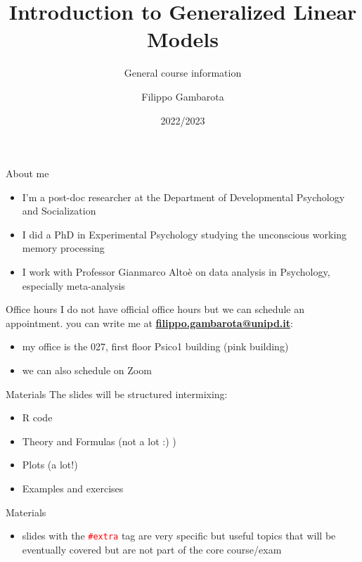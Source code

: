 \documentclass[
  ignorenonframetext,
]{beamer}
\title{Introduction to Generalized Linear Models}
\subtitle{General course information}
\author{Filippo Gambarota}
\date{2022/2023}
\institute{University of Padova}
\providecommand{\tightlist}{%
  \setlength{\itemsep}{0pt}\setlength{\parskip}{0pt}}
\begin{document}
\frame{\titlepage}

\begin{frame}{About me}
\protect\hypertarget{about-me}{}
\begin{itemize}
\tightlist
\item
  I'm a post-doc researcher at the Department of Developmental
  Psychology and Socialization
\item
  I did a PhD in Experimental Psychology studying the unconscious
  working memory processing
\item
  I work with Professor Gianmarco Altoè on data analysis in Psychology,
  especially meta-analysis
\end{itemize}
\end{frame}

\begin{frame}{Office hours}
\protect\hypertarget{office-hours}{}
I do not have official office hours but we can schedule an appointment.
you can write me at
\textbf{\href{mailto::filippo.gambarota@unipd.it}{filippo.gambarota@unipd.it}}:

\begin{itemize}
\tightlist
\item
  my office is the 027, first floor Psico1 building (pink building)
\item
  we can also schedule on Zoom
\end{itemize}
\end{frame}

\begin{frame}{Materials}
\protect\hypertarget{materials}{}
The slides will be structured intermixing:

\begin{itemize}
\tightlist
\item
  R code
\item
  Theory and Formulas (not a lot :) )
\item
  Plots (a lot!)
\item
  Examples and exercises
\end{itemize}
\end{frame}

\begin{frame}{Materials}
\protect\hypertarget{materials-1}{}
\begin{itemize}
\tightlist
\item
  slides with the \texttt{\textcolor{red}{\#extra}} tag are very
  specific but useful topics that will be eventually covered but are not
  part of the core course/exam
\end{itemize}
\end{frame}
\end{document}
